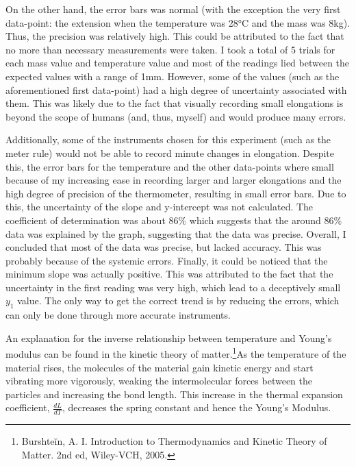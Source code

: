 \documentclass{article}
\begin{document}
\par{On the other hand, the error bars was normal (with the exception the very first data-point: the extension when the temperature was 28°C and the mass was 8kg). Thus, the precision was relatively high. This could be attributed to the fact that no more than necessary measurements were taken. I took a total of 5 trials for each mass value and temperature value and most of the readings lied between the expected values with a range of 1mm. However, some of the values (such as the aforementioned first data-point) had a high degree of uncertainty associated with them. This was likely due to the fact that visually recording small elongations is beyond the scope of humans (and, thus, myself) and would produce many errors.}
\vspace{-0.25cm}
\par{Additionally, some of the instruments chosen for this experiment (such as the meter rule) would not be able to record minute changes in elongation. Despite this, the error bars for the temperature and the other data-points where small because of my increasing ease in recording larger and larger elongations and the high degree of precision of the thermometer, resulting in small error bars. Due to this, the uncertainty of the slope and y-intercept was not calculated. The coefficient of determination was about $86\%$ which suggests that the around $86\%$ data was explained by the graph, suggesting that the data was precise. Overall, I concluded that most of the data was precise, but lacked accuracy. This was probably because of the systemic errors. Finally, it could be noticed that the minimum slope was actually positive. This was attributed to the fact that the uncertainty in the first reading was very high, which lead to a deceptively small $y_1$ value. The only way to get the correct trend is by reducing the errors, which can only be done through more accurate instruments.}
\vspace{-0.25cm}
\par{An explanation for the inverse relationship between temperature and Young's modulus can be found in the kinetic theory of matter.\footnote{Burshteĭn, A. I. Introduction to Thermodynamics and Kinetic Theory of Matter. 2nd ed, Wiley-VCH, 2005.
}As the temperature of the material rises, the molecules of the material gain kinetic energy and start vibrating more vigorously, weaking the intermolecular forces between the particles and increasing the bond length. This increase in the thermal expansion coefficient, $\frac{dL}{dT}$, decreases the spring constant and hence the Young's Modulus.}
\end{document}
